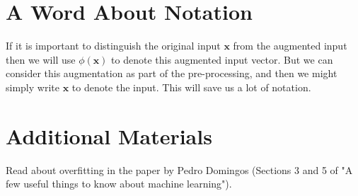 \documentclass[10pt]{article}
\begin{document}
\section*{A Word About Notation}
If it is important to distinguish the original input $\mathbf{x}$ from the augmented input then we will use $\phi(\mathbf{x})$ to denote this augmented input vector. But we can consider this augmentation as part of the pre-processing, and then we might simply write $\mathbf{x}$ to denote the input. This will save us a lot of notation.

\section*{Additional Materials}
Read about overfitting in the paper by Pedro Domingos (Sections 3 and 5 of "A few useful things to know about machine learning").
\end{document}
